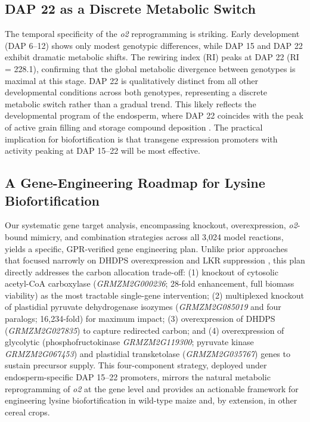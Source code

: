\documentclass[12pt,a4paper]{article}
\begin{document}
\subsection{DAP 22 as a Discrete Metabolic Switch}

The temporal specificity of the \textit{o2} reprogramming is striking. Early development (DAP 6--12) shows only modest genotypic differences, while DAP 15 and DAP 22 exhibit dramatic metabolic shifts. The rewiring index (RI) peaks at DAP 22 (RI = 228.1), confirming that the global metabolic divergence between genotypes is maximal at this stage. DAP 22 is qualitatively distinct from all other developmental conditions across both genotypes, representing a discrete metabolic switch rather than a gradual trend. This likely reflects the developmental program of the endosperm, where DAP 22 coincides with the peak of active grain filling and storage compound deposition \citep{Lending1989, Woo2001}. The practical implication for biofortification is that transgene expression promoters with activity peaking at DAP 15--22 will be most effective.

\subsection{A Gene-Engineering Roadmap for Lysine Biofortification}

Our systematic gene target analysis, encompassing knockout, overexpression, \textit{o2}-bound mimicry, and combination strategies across all 3,024 model reactions, yields a specific, GPR-verified gene engineering plan. Unlike prior approaches that focused narrowly on DHDPS overexpression and LKR suppression \citep{Frizzi2008, Houmard2007}, this plan directly addresses the carbon allocation trade-off: (1) knockout of cytosolic acetyl-CoA carboxylase (\textit{GRMZM2G000236}; 28-fold enhancement, full biomass viability) as the most tractable single-gene intervention; (2) multiplexed knockout of plastidial pyruvate dehydrogenase isozymes (\textit{GRMZM2G085019} and four paralogs; 16,234-fold) for maximum impact; (3) overexpression of DHDPS (\textit{GRMZM2G027835}) to capture redirected carbon; and (4) overexpression of glycolytic (phosphofructokinase \textit{GRMZM2G119300}; pyruvate kinase \textit{GRMZM2G067453}) and plastidial transketolase (\textit{GRMZM2G035767}) genes to sustain precursor supply. This four-component strategy, deployed under endosperm-specific DAP 15--22 promoters, mirrors the natural metabolic reprogramming of \textit{o2} at the gene level and provides an actionable framework for engineering lysine biofortification in wild-type maize and, by extension, in other cereal crops.
\end{document}
